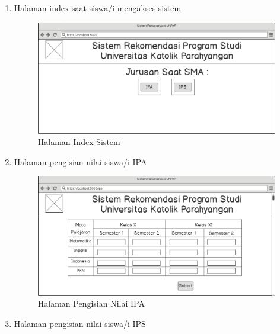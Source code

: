 \begin{enumerate}
    \item Halaman index saat siswa/i mengakses sistem
    
    \begin{figure}[H]
        \centering
        \includegraphics[width = 12cm, height =8 cm]{doc/DokumenSkripsi/Gambar/gambar41.png}
        \caption{Halaman Index Sistem}
        \label{fig:gambar41}
    \end{figure}
    
    \item Halaman pengisian nilai siswa/i IPA
    
    \begin{figure}[H]
        \centering
        \includegraphics[width = 12cm, height =8 cm]{doc/DokumenSkripsi/Gambar/gambar42.png}
        \caption{Halaman Pengisian Nilai IPA}
        \label{fig:gambar42}
    \end{figure}
    
    \item Halaman pengisian nilai siswa/i IPS
    

\end{enumerate}
